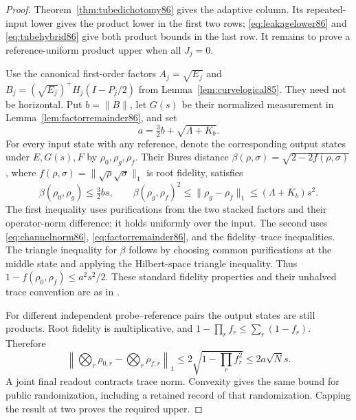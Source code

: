 \begin{proof}
Theorem~\ref{thm:tubedichotomy86} gives the adaptive column.  Its
repeated-input lower gives the product lower in the first two rows;
\eqref{eq:leakagelower86} and \eqref{eq:tubehybrid86} give both
product bounds in the last row.  It remains to prove a
reference-uniform product upper when all $J_j=0$.

Use the canonical first-order factors
$A_j=\sqrt{E_j}$ and $B_j=(\sqrt{E_j})^+H_j(I-P_j/2)$ from
Lemma~\ref{lem:curvelogical85}.  They need not be horizontal.
Put $b=\|B\|$, let $G(s)$ be their normalized measurement in
Lemma~\ref{lem:factorremainder86}, and set
\[
 a=\tfrac32 b+\sqrt{\Lambda+K_b}.
\]
For every input state with any reference, denote the corresponding
output states under $E,G(s),F$ by $\rho_0,\rho_g,\rho_f$.
Their Bures distance
$\beta(\rho,\sigma)=\sqrt{2-2f(\rho,\sigma)}$, where
$f(\rho,\sigma)=\|\sqrt\rho\sqrt\sigma\|_1$ is root fidelity,
satisfies
\[
 \beta(\rho_0,\rho_g)\le\tfrac32bs,
 \qquad
 \beta(\rho_g,\rho_f)^2\le\|\rho_g-\rho_f\|_1
                        \le(\Lambda+K_b)s^2.
\]
The first inequality uses purifications from the two stacked factors
and their operator-norm difference; it holds uniformly over the input.
The second uses \eqref{eq:channelnorm86},
\eqref{eq:factorremainder86}, and the fidelity--trace inequalities.
The triangle inequality for $\beta$ follows by choosing common
purifications at the middle state and applying the Hilbert-space
triangle inequality.  Thus $1-f(\rho_0,\rho_f)\le a^2s^2/2$.
These standard fidelity properties and their unhalved trace convention
are as in \cite[Proposition~3.16 and Theorems~3.22, 3.33]{Watrous65}.

For different independent probe--reference pairs the output states
are still products.  Root fidelity is multiplicative, and
$1-\prod_r f_r\le\sum_r(1-f_r)$.  Therefore
\[
 \left\|\bigotimes_r\rho_{0,r}-\bigotimes_r\rho_{f,r}\right\|_1
 \le2\sqrt{1-\prod_r f_r^2}
 \le2a\sqrt N s.
\]
A joint final readout contracts trace norm.  Convexity gives the same
bound for public randomization, including a retained record of that
randomization.  Capping the result at two proves the required upper.
\end{proof}

